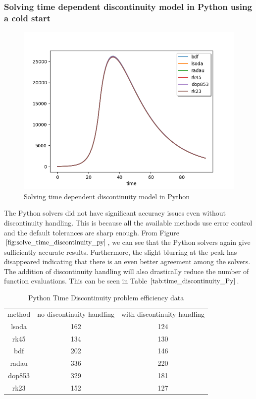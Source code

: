 \subsubsection{Solving time dependent discontinuity model in Python using a cold start} 
\begin{figure}[h]
\centering
\includegraphics[width=0.7\linewidth]{./figures/solve_time_discontinuity_py}
\caption{Solving time dependent discontinuity model in Python}
\label{fig:solve_time_discontinuity_py}
\end{figure}
The Python solvers did not have significant accuracy issues even without discontinuity handling. This is because all the available methods use error control and the default tolerances are sharp enough. From Figure $\ref{fig:solve_time_discontinuity_py}$, we can see that the Python solvers again give sufficiently accurate results. Furthermore, the slight blurring at the peak has disappeared indicating that there is an even better agreement among the solvers. The addition of discontinuity handling will also drastically reduce the number of function evaluations. This can be seen in Table $\ref{tab:time_discontinuity_Py}$.

\begin{table}[h]
\caption {Python Time Discontinuity problem efficiency data} \label{tab:time_discontinuity_Py} 
\begin{center}
\begin{tabular}{ c c c }
method & no discontinuity handling & with discontinuity handling \\ 
lsoda & 162 & 124 \\
rk45 & 134 & 130 \\
bdf & 202 & 146 \\
radau & 336 & 220 \\
dop853 & 329 & 181 \\
rk23 & 152 & 127 \\
\end{tabular}
\end{center}
\end{table}

